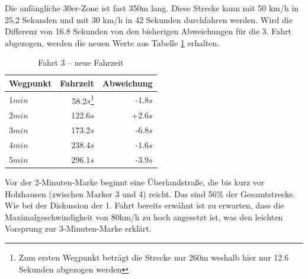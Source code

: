 Die anfängliche 30er-Zone ist fast 350m lang.
Diese Strecke kann mit 50 km/h in 25,2 Sekunden und mit 30 km/h in 42 Sekunden durchfahren werden.
Wird die Differenz von 16.8 Sekunden von den bisherigen Abweichungen für die 3. Fahrt abgezogen, werden die neuen Werte aus Tabelle \ref{tab:new3} erhalten.

\begin{table}[htb]
\centering
\caption{Fahrt 3 -- neue Fahrzeit}
\label{tab:new3}
\begin{tabular}{|l|r|r|}
\hline
Wegpunkt & Fahrzeit & Abweichung \\ \hline 
1$min$ & 58.2$s$\footnote{Zum ersten Wegpunkt beträgt die Strecke nur 260m weshalb hier nur 12.6 Sekunden abgezogen werden} & -1.8$s$  \\
2$min$ & 122.6$s$ & +2.6$s$  \\
3$min$ & 173.2$s$ & -6.8$s$  \\
4$min$ & 238.4$s$ & -1.6$s$  \\
5$min$ & 296.1$s$ & -3.9$s$  \\
\hline
\end{tabular}
\end{table}

Vor der 2-Minuten-Marke beginnt eine Überlandstraße, die bis kurz vor Holzhausen (zwischen Marker 3 und 4) reicht.
Das sind 56$\%$ der Gesamtstrecke.
Wie bei der Diskussion der 1. Fahrt bereits erwähnt ist zu erwarten, dass die Maximalgeschwindigkeit von 80km/h zu hoch angesetzt ist, was den leichten Vorsprung zur 3-Minuten-Marke erklärt.

